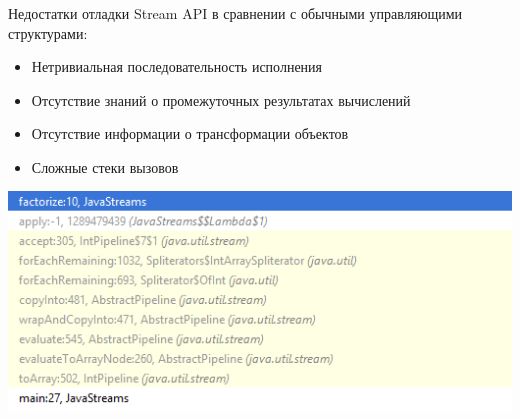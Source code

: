 \begin{frame}
\frametitle{\insertsection} 
\framesubtitle{\insertsubsection}
Недостатки отладки Stream API в сравнении с обычными управляющими структурами:
\begin{itemize}
	\item Нетривиальная последовательность исполнения
	\item Отсутствие знаний о промежуточных результатах вычислений 
	\item Отсутствие информации о трансформации объектов
	\item Сложные стеки вызовов
\end{itemize}

\includegraphics[scale=0.6]{img/stack-trace.png}
\end{frame}

